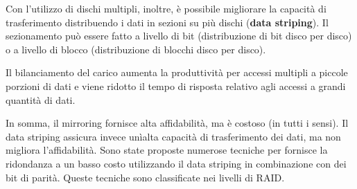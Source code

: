 \documentclass[a4]{article}
\begin{document}
Con l'utilizzo di dischi multipli, inoltre, è possibile migliorare la capacità di trasferimento distribuendo i dati in sezioni su più dischi (\textbf{data striping}). Il sezionamento può essere fatto a livello di bit (distribuzione di bit disco per disco) o a livello di blocco (distribuzione di blocchi disco per disco).

Il bilanciamento del carico aumenta la produttività per accessi multipli a piccole porzioni di dati e viene ridotto il tempo di risposta relativo agli accessi a grandi quantità di dati.

In somma, il mirroring fornisce alta affidabilità, ma è costoso (in tutti i sensi). Il data striping assicura invece unìalta capacità di trasferimento dei dati, ma non migliora l'affidabilità. Sono state proposte numerose tecniche per fornisce la ridondanza a un basso costo utilizzando il data striping in combinazione con dei bit di parità. Queste tecniche sono classificate nei livelli di RAID.
\end{document}
